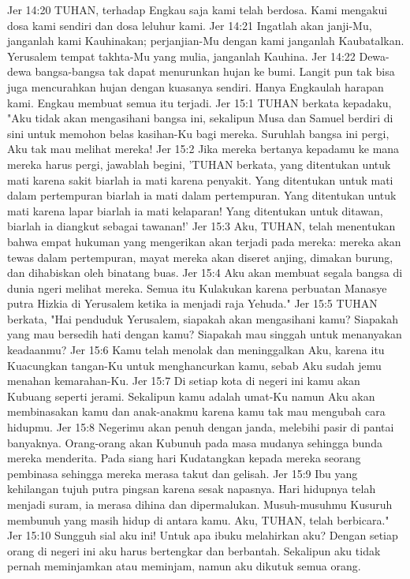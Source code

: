 Jer 14:20  TUHAN, terhadap Engkau saja kami telah berdosa. Kami mengakui dosa kami sendiri dan dosa leluhur kami.
Jer 14:21  Ingatlah akan janji-Mu, janganlah kami Kauhinakan; perjanjian-Mu dengan kami janganlah Kaubatalkan. Yerusalem tempat takhta-Mu yang mulia, janganlah Kauhina.
Jer 14:22  Dewa-dewa bangsa-bangsa tak dapat menurunkan hujan ke bumi. Langit pun tak bisa juga mencurahkan hujan dengan kuasanya sendiri. Hanya Engkaulah harapan kami. Engkau membuat semua itu terjadi.
Jer 15:1  TUHAN berkata kepadaku, "Aku tidak akan mengasihani bangsa ini, sekalipun Musa dan Samuel berdiri di sini untuk memohon belas kasihan-Ku bagi mereka. Suruhlah bangsa ini pergi, Aku tak mau melihat mereka!
Jer 15:2  Jika mereka bertanya kepadamu ke mana mereka harus pergi, jawablah begini, 'TUHAN berkata, yang ditentukan untuk mati karena sakit biarlah ia mati karena penyakit. Yang ditentukan untuk mati dalam pertempuran biarlah ia mati dalam pertempuran. Yang ditentukan untuk mati karena lapar biarlah ia mati kelaparan! Yang ditentukan untuk ditawan, biarlah ia diangkut sebagai tawanan!'
Jer 15:3  Aku, TUHAN, telah menentukan bahwa empat hukuman yang mengerikan akan terjadi pada mereka: mereka akan tewas dalam pertempuran, mayat mereka akan diseret anjing, dimakan burung, dan dihabiskan oleh binatang buas.
Jer 15:4  Aku akan membuat segala bangsa di dunia ngeri melihat mereka. Semua itu Kulakukan karena perbuatan Manasye putra Hizkia di Yerusalem ketika ia menjadi raja Yehuda."
Jer 15:5  TUHAN berkata, "Hai penduduk Yerusalem, siapakah akan mengasihani kamu? Siapakah yang mau bersedih hati dengan kamu? Siapakah mau singgah untuk menanyakan keadaanmu?
Jer 15:6  Kamu telah menolak dan meninggalkan Aku, karena itu Kuacungkan tangan-Ku untuk menghancurkan kamu, sebab Aku sudah jemu menahan kemarahan-Ku.
Jer 15:7  Di setiap kota di negeri ini kamu akan Kubuang seperti jerami. Sekalipun kamu adalah umat-Ku namun Aku akan membinasakan kamu dan anak-anakmu karena kamu tak mau mengubah cara hidupmu.
Jer 15:8  Negerimu akan penuh dengan janda, melebihi pasir di pantai banyaknya. Orang-orang akan Kubunuh pada masa mudanya sehingga bunda mereka menderita. Pada siang hari Kudatangkan kepada mereka seorang pembinasa sehingga mereka merasa takut dan gelisah.
Jer 15:9  Ibu yang kehilangan tujuh putra pingsan karena sesak napasnya. Hari hidupnya telah menjadi suram, ia merasa dihina dan dipermalukan. Musuh-musuhmu Kusuruh membunuh yang masih hidup di antara kamu. Aku, TUHAN, telah berbicara."
Jer 15:10  Sungguh sial aku ini! Untuk apa ibuku melahirkan aku? Dengan setiap orang di negeri ini aku harus bertengkar dan berbantah. Sekalipun aku tidak pernah meminjamkan atau meminjam, namun aku dikutuk semua orang.

